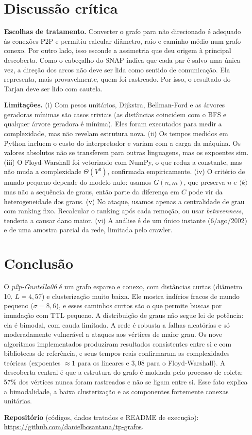 \documentclass[sigconf]{webmedia}
\newcommand{\repo}{\url{https://github.com/danielbcsantana/tp-grafos}}
\begin{document}
\section{Discussão crítica}
\textbf{Escolhas de tratamento.} Converter o grafo para não direcionado é adequado
às conexões P2P e permitiu calcular diâmetro, raio e caminho médio num grafo
conexo. Por outro lado, isso esconde a assimetria que deu origem à principal
descoberta. Como o cabeçalho do SNAP indica que cada par é salvo uma única vez, a
direção dos arcos não deve ser lida como sentido de comunicação. Ela representa,
mais provavelmente, quem foi rastreado. Por isso, o resultado do Tarjan deve ser
lido com cautela.

\textbf{Limitações.} (i) Com pesos unitários, Dijkstra, Bellman-Ford e as árvores
geradoras mínimas são casos triviais (as distâncias coincidem com o BFS e qualquer
árvore geradora é mínima). Eles foram executados para medir a complexidade, mas não
revelam estrutura nova. (ii) Os tempos medidos em Python incluem o custo do
interpretador e variam com a carga da máquina. Os valores absolutos não se
transferem para outras linguagens, mas os expoentes sim. (iii) O Floyd-Warshall foi
vetorizado com NumPy, o que reduz a constante, mas não muda a complexidade
$\Theta(V^3)$, confirmada empiricamente. (iv) O critério de mundo pequeno depende do
modelo nulo: usamos $G(n,m)$, que preserva $n$ e $\langle k\rangle$ mas não a
sequência de graus, então parte da diferença em $C$ pode vir da heterogeneidade dos
graus. (v) No ataque, usamos apenas a centralidade de grau com ranking fixo.
Recalcular o ranking após cada remoção, ou usar \textit{betweenness}, tenderia a
causar dano maior. (vi) A análise é de um único instante (6/ago/2002) e de uma
amostra parcial da rede, limitada pelo crawler.

\section{Conclusão}
O \textit{p2p-Gnutella06} é um grafo esparso e conexo, com distâncias curtas
(diâmetro 10, $L=4{,}57$) e clusterização muito baixa. Ele mostra indícios fracos
de mundo pequeno ($\sigma=8{,}6$), e esses caminhos curtos são o que permite buscas
por inundação com TTL pequeno. A distribuição de graus não segue lei de potência:
ela é bimodal, com cauda limitada. A rede é robusta a falhas aleatórias e só
moderadamente vulnerável a ataques aos vértices de maior grau. Os nove algoritmos
implementados produziram resultados consistentes entre si e com bibliotecas de
referência, e seus tempos reais confirmaram as complexidades teóricas (expoentes
$\approx 1$ para os lineares e $3{,}08$ para o Floyd-Warshall). A descoberta
central é que a estrutura do grafo é moldada pelo processo de coleta: 57\% dos
vértices nunca foram rastreados e não se ligam entre si. Esse fato explica a
bimodalidade, a baixa clusterização e as componentes fortemente conexas unitárias.

\textbf{Repositório} (códigos, dados tratados e README de execução):\\ \repo.



\end{document}
